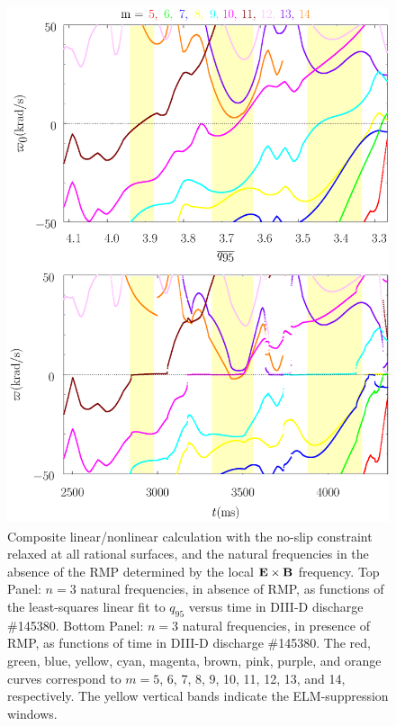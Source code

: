\documentclass[12pt,prb,aps]{revtex4-1}
\begin{document}
\begin{figure}
\includegraphics[height=6in]{fig4.pdf}
\caption{Composite linear/nonlinear calculation with the no-slip constraint relaxed at all rational surfaces, and the natural frequencies
in the absence of the RMP determined by the local  ${\bf E}\times {\bf B}$
frequency.
Top Panel: $n=3$ natural frequencies, in absence of RMP, as functions of the least-squares linear fit to $q_{95}$ versus time
in   DIII-D discharge \#145380.
Bottom Panel:  $n=3$ natural frequencies, in presence of RMP, as functions of time
in   DIII-D discharge \#145380. The red, green, blue, yellow, cyan, magenta, brown, pink,
purple, and orange  curves correspond to $m=5$, 6, 7, 8, 9, 10, 11, 12, 13, and 14, respectively. The yellow vertical bands indicate the ELM-suppression windows.} \label{fig4}
\end{figure}
\end{document}
